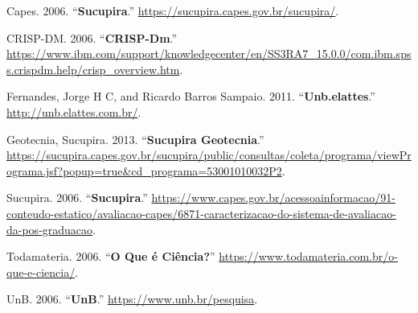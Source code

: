 \documentclass[]{article}
\begin{document}
\leavevmode\hypertarget{ref-sucupira}{}%
Capes. 2006. ``\textbf{Sucupira}.''
\url{https://sucupira.capes.gov.br/sucupira/}.

\leavevmode\hypertarget{ref-crispdm}{}%
CRISP-DM. 2006. ``\textbf{CRISP-Dm}.''
\url{https://www.ibm.com/support/knowledgecenter/en/SS3RA7_15.0.0/com.ibm.spss.crispdm.help/crisp_overview.htm}.

\leavevmode\hypertarget{ref-unb_elattes_2011}{}%
Fernandes, Jorge H C, and Ricardo Barros Sampaio. 2011.
``\textbf{Unb.elattes}.'' \url{http://unb.elattes.com.br/}.

\leavevmode\hypertarget{ref-sucupira_geotecnia}{}%
Geotecnia, Sucupira. 2013. ``\textbf{Sucupira Geotecnia}.''
\url{https://sucupira.capes.gov.br/sucupira/public/consultas/coleta/programa/viewPrograma.jsf?popup=true\&cd_programa=53001010032P2}.

\leavevmode\hypertarget{ref-capes}{}%
Sucupira. 2006. ``\textbf{Sucupira}.''
\url{https://www.capes.gov.br/acessoainformacao/91-conteudo-estatico/avaliacao-capes/6871-caracterizacao-do-sistema-de-avaliacao-da-pos-graduacao}.

\leavevmode\hypertarget{ref-ciencia}{}%
Todamateria. 2006. ``\textbf{O Que é Ciência?}''
\url{https://www.todamateria.com.br/o-que-e-ciencia/}.

\leavevmode\hypertarget{ref-unb}{}%
UnB. 2006. ``\textbf{UnB}.'' \url{https://www.unb.br/pesquisa}.
\end{document}
